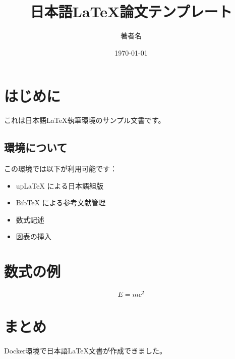 \documentclass[a4paper,12pt]{jsarticle}
\title{日本語LaTeX論文テンプレート}
\author{著者名}
\date{\today}
\begin{document}
\maketitle

\tableofcontents
\newpage

\section{はじめに}

これは日本語LaTeX執筆環境のサンプル文書です。

\subsection{環境について}

この環境では以下が利用可能です：
\begin{itemize}
    \item upLaTeX による日本語組版
    \item BibTeX による参考文献管理
    \item 数式記述
    \item 図表の挿入
\end{itemize}

\section{数式の例}

\begin{equation}
    E = mc^2
\end{equation}

\section{まとめ}

Docker環境で日本語LaTeX文書が作成できました。
\end{document}
